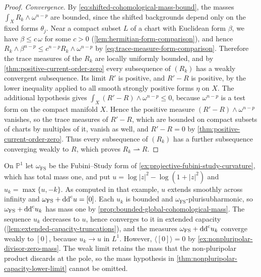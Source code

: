 \begin{proof}
\emph{Convergence.} By \eqref{eq:shifted-cohomological-mass-bound}, the masses $\int_XR_k\wedge\omega^{n-p}$ are bounded, since the shifted backgrounds depend only on the fixed forms $\theta_j$. Near a compact subset $L$ of a chart with Euclidean form $\beta$, we have $\beta\leq c\,\omega$ for some $c>0$ (\cref{lem:hermitian-form-comparison}), and hence $R_k\wedge\beta^{n-p}\leq c^{n-p}R_k\wedge\omega^{n-p}$ by \eqref{eq:trace-measure-form-comparison}. Therefore the trace measures of the $R_k$ are locally uniformly bounded, and by \cref{thm:positive-current-order-zero} every subsequence of $(R_k)$ has a weakly convergent subsequence. Its limit $R'$ is positive, and $R'-R$ is positive, by the lower inequality applied to all smooth strongly positive forms $\eta$ on $X$. The additional hypothesis gives $\int_X(R'-R)\wedge\omega^{n-p}\leq0$, because $\omega^{n-p}$ is a test form on the compact manifold $X$. Hence the positive measure $(R'-R)\wedge\omega^{n-p}$ vanishes, so the trace measures of $R'-R$, which are bounded on compact subsets of charts by multiples of it, vanish as well, and $R'-R=0$ by \cref{thm:positive-current-order-zero}. Thus every subsequence of $(R_k)$ has a further subsequence converging weakly to $R$, which proves $R_k\rightharpoonup R$.
\end{proof}

\begin{example}\label{ex:nonpluripolar-mass-loss}
On $\mathbb P^1$ let $\omega_{\mathrm{FS}}$ be the Fubini--Study form of \cref{ex:projective-fubini-study-curvature}, which has total mass one, and put $u=\log|z|^2-\log(1+|z|^2)$ and $u_k=\max\{u,-k\}$. As computed in that example, $u$ extends smoothly across infinity and $\omega_{\mathrm{FS}}+\mathrm{dd}^{\mathrm{c}} u=[0]$. Each $u_k$ is bounded and $\omega_{\mathrm{FS}}$-plurisubharmonic, so $\omega_{\mathrm{FS}}+\mathrm{dd}^{\mathrm{c}} u_k$ has mass one by \cref{prop:bounded-global-cohomological-mass}. The sequence $u_k$ decreases to $u$, hence converges to it in extended capacity (\cref{lem:extended-capacity-truncations}), and the measures $\omega_{\mathrm{FS}}+\mathrm{dd}^{\mathrm{c}} u_k$ converge weakly to $[0]$, because $u_k\to u$ in $L^1$. However, $\langle[0]\rangle=0$ by \cref{ex:nonpluripolar-divisor-zero-mass}. The weak limit retains the mass that the non-pluripolar product discards at the pole, so the mass hypothesis in \cref{thm:nonpluripolar-capacity-lower-limit} cannot be omitted.
\end{example}



